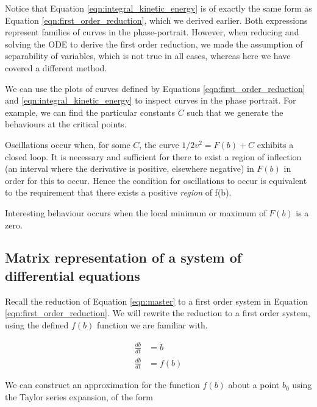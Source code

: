 \documentclass{article}
\begin{document}

Notice that Equation \ref{eqn:integral_kinetic_energy} is of exactly the same form as Equation \ref{eqn:first_order_reduction},
which we derived earlier.
Both expressions represent families of curves in the phase-portrait.
However, when reducing and solving the ODE to derive the first order reduction, we made the assumption of separability of variables,
which is not true in all cases,
whereas here we have covered a different method.

We can use the plots of curves defined by Equations \ref{eqn:first_order_reduction} and \ref{eqn:integral_kinetic_energy} to inspect curves in the phase portrait.
For example, we can find the particular constants $C$ such that we generate the behaviours at the critical points.


Oscillations occur when, for some $C$, the curve $1/2 v^2 = F(b) + C$ exhibits a closed loop.
It is necessary and sufficient for there to exist a region of inflection (an interval where the derivative is positive,
elsewhere negative) in $F(b)$ in order for this to occur.
Hence the condition for oscillations to occur is equivalent to the requirement that there exists a positive \textit{region} of f(b).

Interesting behaviour occurs when the local minimum or maximum of $F(b)$ is a zero. %

\subsection{Matrix representation of a system of differential equations}

Recall the reduction of Equation \ref{eqn:master} to a first order system in Equation \ref{eqn:first_order_reduction}.
We will rewrite the reduction to a first order system, using the defined $f(b)$ function we are familiar with.

\begin{align}
    \frac{db}{dt}       & = \dot{b} \\
    \frac{d\dot{b}}{dt} & = f(b)
    \label{eqn:first_order_modified}
\end{align}

We can construct an approximation for the function $f(b)$ about a point $b_0$ using the Taylor series expansion, of the form
\end{document}
